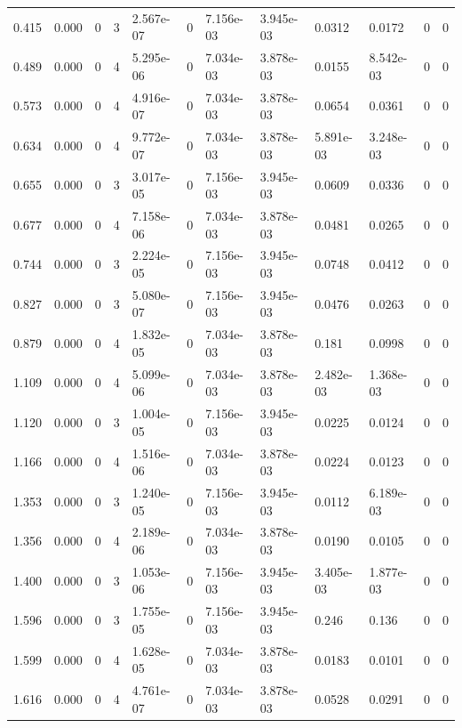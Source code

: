 \documentclass[preview]{standalone}
\begin{document}
{{\begin{tabular}{L{1.2cm}C{1.2cm} C{0.3cm}C{0.5cm} C{1.4cm}C{1.4cm} C{1.4cm}C{1.4cm} C{1.6cm}C{1.6cm} C{1.6cm}C{1.6cm}}
  0.415  &  0.000  & 0     &  3 &  2.567e-07  & 0  &  7.156e-03&   3.945e-03& 0.0312 & 0.0172   &  0 & 0  \\ 
  0.489  &  0.000  & 0     &  4 &  5.295e-06  & 0  &  7.034e-03&   3.878e-03& 0.0155 & 8.542e-03   &  0 & 0  \\ 
  0.573  &  0.000  & 0     &  4 &  4.916e-07  & 0  &  7.034e-03&   3.878e-03& 0.0654 & 0.0361   &  0 & 0  \\ 
  0.634  &  0.000  & 0     &  4 &  9.772e-07  & 0  &  7.034e-03&   3.878e-03& 5.891e-03 & 3.248e-03   &  0 & 0  \\ 
  0.655  &  0.000  & 0     &  3 &  3.017e-05  & 0  &  7.156e-03&   3.945e-03& 0.0609 & 0.0336   &  0 & 0  \\ 
  0.677  &  0.000  & 0     &  4 &  7.158e-06  & 0  &  7.034e-03&   3.878e-03& 0.0481 & 0.0265   &  0 & 0  \\ 
  0.744  &  0.000  & 0     &  3 &  2.224e-05  & 0  &  7.156e-03&   3.945e-03& 0.0748 & 0.0412   &  0 & 0  \\ 
  0.827  &  0.000  & 0     &  3 &  5.080e-07  & 0  &  7.156e-03&   3.945e-03& 0.0476 & 0.0263   &  0 & 0  \\ 
  0.879  &  0.000  & 0     &  4 &  1.832e-05  & 0  &  7.034e-03&   3.878e-03& 0.181 & 0.0998   &  0 & 0  \\ 
  1.109  &  0.000  & 0     &  4 &  5.099e-06  & 0  &  7.034e-03&   3.878e-03& 2.482e-03 & 1.368e-03   &  0 & 0  \\ 
  1.120  &  0.000  & 0     &  3 &  1.004e-05  & 0  &  7.156e-03&   3.945e-03& 0.0225 & 0.0124   &  0 & 0  \\ 
  1.166  &  0.000  & 0     &  4 &  1.516e-06  & 0  &  7.034e-03&   3.878e-03& 0.0224 & 0.0123   &  0 & 0  \\ 
  1.353  &  0.000  & 0     &  3 &  1.240e-05  & 0  &  7.156e-03&   3.945e-03& 0.0112 & 6.189e-03   &  0 & 0  \\ 
  1.356  &  0.000  & 0     &  4 &  2.189e-06  & 0  &  7.034e-03&   3.878e-03& 0.0190 & 0.0105   &  0 & 0  \\ 
  1.400  &  0.000  & 0     &  3 &  1.053e-06  & 0  &  7.156e-03&   3.945e-03& 3.405e-03 & 1.877e-03   &  0 & 0  \\ 
  1.596  &  0.000  & 0     &  3 &  1.755e-05  & 0  &  7.156e-03&   3.945e-03& 0.246 & 0.136   &  0 & 0  \\ 
  1.599  &  0.000  & 0     &  4 &  1.628e-05  & 0  &  7.034e-03&   3.878e-03& 0.0183 & 0.0101   &  0 & 0  \\ 
  1.616  &  0.000  & 0     &  4 &  4.761e-07  & 0  &  7.034e-03&   3.878e-03& 0.0528 & 0.0291   &  0 & 0  \\ 

\end{tabular}}}
\end{document}
